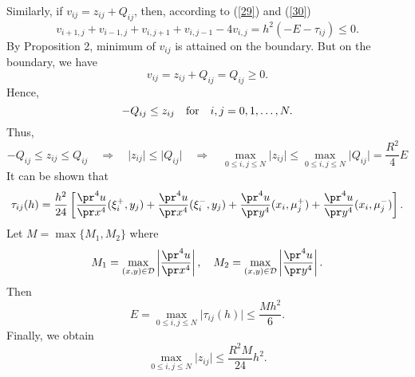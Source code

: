  
 
Similarly, if $v_{ij}=z_{ij}+Q_{ij}$, then, according to (\ref{29}) and (\ref{30})
\[
v_{i+1,j}+v_{i-1,j}+v_{i,j+1}+v_{i,j-1}-4v_{i,j}=h^{2}(-E-\tau_{ij})\leq 0.
\]
By Proposition 2, minimum of $v_{ij}$ is attained on the boundary. But on the boundary, we have
\[
v_{ij}=z_{ij}+Q_{ij}=Q_{ij}\geq 0.
\]
Hence,
\[
-Q_{ij}\leq z_{ij} \quad \hbox{for} \quad i,j=0,1,\dots, N.
\]
Thus,
\[
-Q_{ij}\leq z_{ij}\leq Q_{ij} \quad \Rightarrow \quad \vert z_{ij}\vert \leq \vert Q_{ij}\vert
\quad \Rightarrow \quad \max_{0\leq i,j\leq N}\vert z_{ij}\vert \leq
\max_{0\leq i,j\leq N}\vert Q_{ij}\vert=\frac{R^{2}}{4}E
\]
It can be shown that
\[
\tau_{ij}(h)=\frac{h^{2}}{24}\left[\frac{\pr^{4} u}{\pr x^{4}}(\xi^{+}_{i},y_{j})+
\frac{\pr^{4} u}{\pr x^{4}}(\xi^{-}_{i},y_{j})
+\frac{\pr^{4} u}{\pr y^{4}}(x_{i},\mu^{+}_{j})+
\frac{\pr^{4} u}{\pr y^{4}}(x_{i},\mu^{-}_{j})\right].
\]
Let $M=\max\{M_{1}, M_{2}\}$ where
\[
M_{1}=\max_{(x,y)\in{\cal D}} \left\vert \frac{\pr^{4}u}{\pr x^{4}}\right\vert, \quad
M_{2}=\max_{(x,y)\in{\cal D}} \left\vert \frac{\pr^{4}u}{\pr y^{4}}\right\vert.
\]
Then
\[
E=\max_{0\leq i,j\leq N}\vert \tau_{ij}(h)\vert\leq \frac{Mh^{2}}{6}.
\]
Finally, we obtain
\[
\max_{0\leq i,j\leq N}\vert z_{ij}\vert \leq \frac{R^{2}M}{24}h^{2}.
\]






